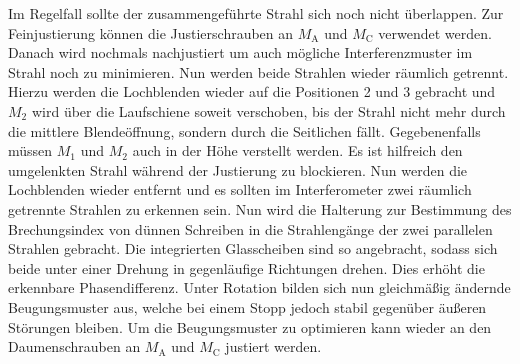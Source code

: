 Im Regelfall sollte der zusammengeführte Strahl sich noch nicht überlappen. Zur Feinjustierung können die Justierschrauben an $M_\text{A}$ und $M_\text{C}$ verwendet werden. Danach wird nochmals nachjustiert um auch mögliche Interferenzmuster im Strahl noch zu minimieren.
  Nun werden beide Strahlen wieder räumlich getrennt.
  Hierzu werden die Lochblenden wieder auf die Positionen 2 und 3 gebracht und $M_\text{2}$ wird über die Laufschiene soweit verschoben, bis der Strahl nicht mehr durch die mittlere Blendeöffnung, sondern durch die Seitlichen fällt. Gegebenenfalls müssen $M_\text{1}$ und $M_\text{2}$ auch in der Höhe verstellt werden. Es ist hilfreich den umgelenkten Strahl während der Justierung zu blockieren.
Nun werden die Lochblenden wieder entfernt und es sollten im Interferometer zwei räumlich getrennte Strahlen zu erkennen sein.
Nun wird die Halterung zur Bestimmung des Brechungsindex von dünnen Schreiben in die Strahlengänge der zwei parallelen Strahlen gebracht. Die integrierten Glasscheiben sind so angebracht, sodass sich beide unter einer Drehung in gegenläufige Richtungen drehen. Dies erhöht die erkennbare Phasendifferenz. Unter Rotation bilden sich nun gleichmäßig ändernde Beugungsmuster aus, welche bei einem Stopp jedoch stabil gegenüber äußeren Störungen bleiben.
Um die Beugungsmuster zu optimieren kann wieder an den Daumenschrauben an $M_\text{A}$ und $M_\text{C}$ justiert werden.

 
